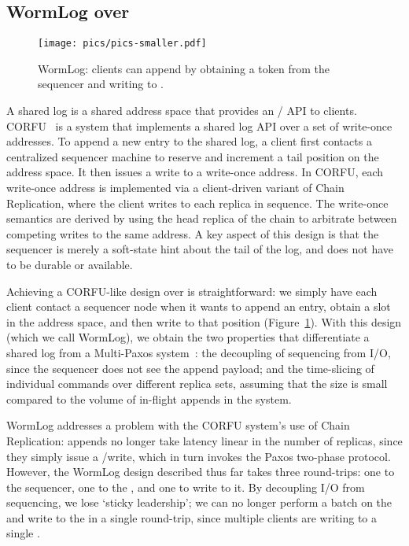 \subsection{WormLog over \sysname{}}

\begin{figure}
\centering
\texttt{[image: pics/pics-smaller.pdf]}
\caption{WormLog: clients can append by obtaining a token from the sequencer and writing to \sysname{}.\label{fig:wormlogarch}}
\vspace{-0.1in}
\end{figure}

A shared log is a shared address space that provides an  /  API to clients. CORFU~\cite{corfu} is a system that implements a shared log API over a set of write-once addresses. To append a new entry to the shared log, a client first contacts a centralized sequencer machine to reserve and increment a tail position on the address space. It then issues a write to a write-once address. In CORFU, each write-once address is implemented via a client-driven variant of Chain Replication, where the client writes to each replica in sequence. The write-once semantics are derived by using the head replica of the chain to arbitrate between competing writes to the same address. A key aspect of this design is that the sequencer is merely a soft-state hint about the tail of the log, and does not have to be durable or available. 

Achieving a CORFU-like design over \sysname{} is straightforward: we simply have each client contact a sequencer node when it wants to append an entry, obtain a slot in the \sysname{} address space, and then write to that position (Figure~\ref{fig:wormlogarch}). With this design (which we call WormLog), we obtain the two properties that differentiate a shared log from a Multi-Paxos system~\cite{corfupaxos}: the decoupling of sequencing from I/O, since the sequencer does not see the append payload; and the time-slicing of individual commands over different replica sets, assuming that the \WOS{} size is small compared to the volume of in-flight appends in the system.

WormLog addresses a problem with the CORFU system's use of Chain Replication: appends no longer take latency linear in the number of replicas, since they simply issue a \sysname{} \prepare{}/write, which in turn invokes the Paxos two-phase protocol. However, the WormLog design described thus far takes three round-trips: one to the sequencer, one to \prepare{} the \WOR{}, and one to write to it. By decoupling I/O from sequencing, we lose `sticky leadership'; we can no longer perform a batch \prepare{} on the \WOS{} and write to the \WOR{} in a single round-trip, since multiple clients are writing to a single \WOS{}.

